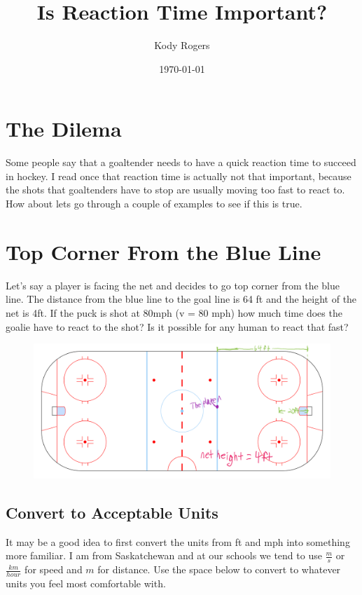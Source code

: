 \documentclass[12pt]{article}
\title{Is Reaction Time Important?}
\author{Kody Rogers}
\date{\today}
\begin{document}
\maketitle
\thispagestyle{empty}

\section{The Dilema}
Some people say that a goaltender needs to have a quick reaction time to succeed in hockey. I read once that reaction time is actually not that important, because the shots that goaltenders have to stop are usually moving too fast to react to. How about lets go through a couple of examples to see if this is true.

\section{Top Corner From the Blue Line}
Let's say a player is facing the net and decides to go top corner from the blue line. The distance from the blue line to the goal line is 64 ft and the height of the net is 4ft. If the puck is shot at 80mph (v = 80 mph) how much time does the goalie have to react to the shot? Is it possible for any human to react that fast?

\begin{figure}[h]
\includegraphics[scale=0.15]{OutlineForHockeyWorksheet.png}
\end{figure}


\subsection{Convert to Acceptable Units}
It may be a good idea to first convert the units from ft and mph into something more familiar. I am from Saskatchewan and at our schools we tend to use $\frac{m}{s}$ or $\frac{km}{hour}$ for speed and $m$ for distance. Use the space below to convert to whatever units you feel most comfortable with.
\end{document}
